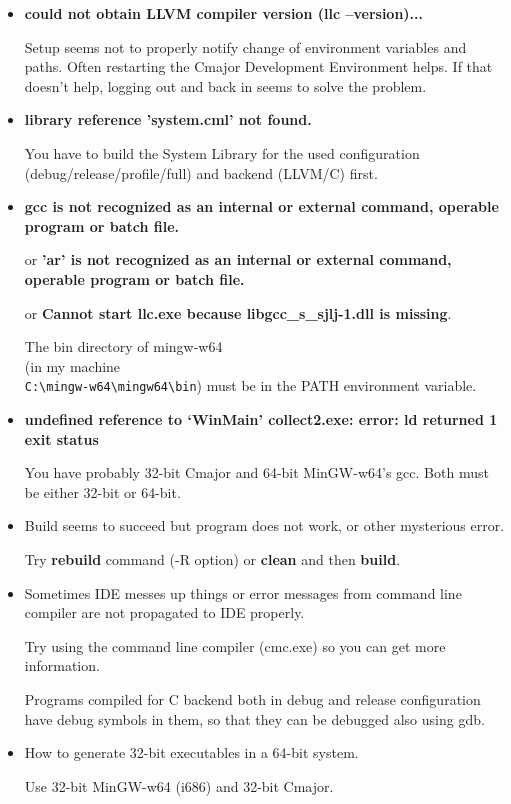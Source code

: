 \documentclass[oneside, a4paper, 11pt]{article}
\begin{document}
\begin{itemize}

\item
\textbf{could not obtain LLVM compiler version (llc --version)...}

Setup seems not to properly notify change of environment variables and paths.
Often restarting the Cmajor Development Environment helps.
If that doesn't help, logging out and back in seems to solve the problem.

\item
\textbf{library reference 'system.cml' not found.}

You have to build the System Library for the used configuration (debug/release/profile/full) and backend (LLVM/C) first.

\item

\textbf{gcc is not recognized as an internal or external command, operable program or batch file.}

or \textbf{'ar' is not recognized as an internal or external command, operable program or batch file.}

or \textbf{Cannot start llc.exe because libgcc\_s\_sjlj-1.dll is missing}.

The bin directory of mingw-w64\\
(in my machine\\
\verb|C:\mingw-w64\mingw64\bin|)
must be in the PATH environment variable.

\item
\textbf{undefined reference to `WinMain' collect2.exe: error: ld returned 1 exit status}

You have probably 32-bit Cmajor and 64-bit MinGW-w64's gcc.
Both must be either 32-bit or 64-bit.

\item
Build seems to succeed but program does not work, or other mysterious error.

Try \textbf{rebuild} command (-R option) or \textbf{clean} and then \textbf{build}.

\item
Sometimes IDE messes up things or error messages from command line compiler are not propagated to IDE properly.

Try using the command line compiler (cmc.exe) so you can get more information.

Programs compiled for C backend both in debug and release configuration have debug symbols in them,
so that they can be debugged also using gdb.

\item
How to generate 32-bit executables in a 64-bit system.

Use 32-bit MinGW-w64 (i686) and 32-bit Cmajor.
\end{itemize}
\end{document}
